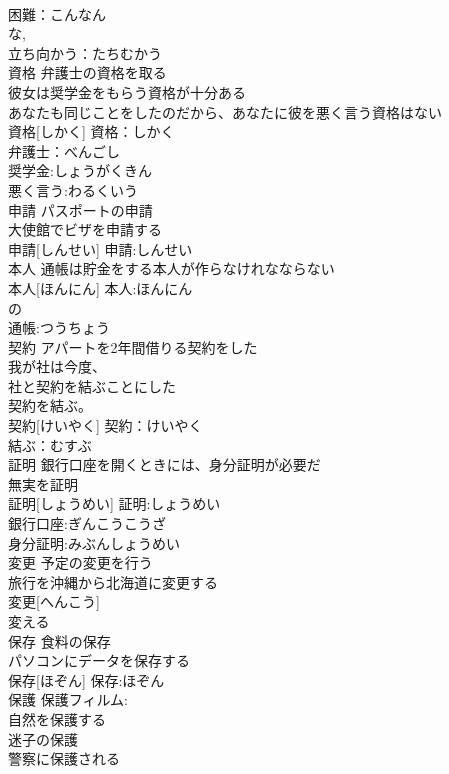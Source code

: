 \documentclass[8pt]{extreport}
\begin{document}
\begin{CJK}{UTF8}{min}
\\	困難：こんなん
\\	な, 
\\	立ち向かう：たちむかう
\\	資格	弁護士の資格を取る 
\\	彼女は奨学金をもらう資格が十分ある 
\\	あなたも同じことをしたのだから、あなたに彼を悪く言う資格はない 
\\	資格[しかく]			資格：しかく
\\	弁護士：べんごし
\\	奨学金:しょうがくきん
\\	悪く言う:わるくいう
\\	申請	パスポートの申請 
\\	大使館でビザを申請する 
\\	申請[しんせい]			申請:しんせい
\\	本人	通帳は貯金をする本人が作らなけれなならない 
\\	本人[ほんにん]			本人:ほんにん
\\	の 
\\	通帳:つうちょう
\\	契約	アパートを2年間借りる契約をした 
\\	我が社は今度、
\\	社と契約を結ぶことにした 
\\	契約を結ぶ。
\\	契約[けいやく]			契約：けいやく
\\	結ぶ：むすぶ
\\	証明	銀行口座を開くときには、身分証明が必要だ 
\\	無実を証明 
\\	証明[しょうめい]			証明:しょうめい
\\	銀行口座:ぎんこうこうざ
\\	身分証明:みぶんしょうめい 
\\	変更	予定の変更を行う 
\\	旅行を沖縄から北海道に変更する 
\\	変更[へんこう]			
\\	変える 
\\	保存	食料の保存 
\\	パソコンにデータを保存する 
\\	保存[ほぞん]			保存:ほぞん
\\	保護	保護フィルム: 
\\	自然を保護する 
\\	迷子の保護 
\\	警察に保護される 

\end{CJK}
\end{document}
